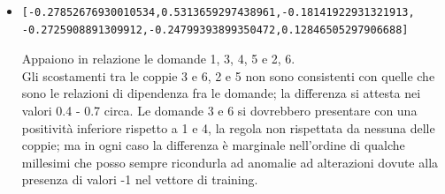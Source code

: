 \begin{itemize}
\item \begin{verbatim}[-0.27852676930010534,0.5313659297438961,-0.18141922931321913,
-0.2725908891309912,-0.24799393899350472,0.12846505297906688]
\end{verbatim}
Appaiono in relazione le domande 1, 3, 4, 5 e  2, 6.\\
Gli scostamenti tra le coppie 3 e 6, 2 e 5 non sono consistenti con quelle che sono le relazioni di dipendenza fra le domande; la differenza si attesta nei valori 0.4 - 0.7 circa. 
Le domande 3 e 6 si dovrebbero presentare con una positivit\`a inferiore rispetto a 1 e 4, la regola  non rispettata da nessuna delle coppie; ma in ogni caso la differenza \`e marginale  nell'ordine di qualche millesimi che posso sempre ricondurla ad anomalie ad alterazioni dovute alla presenza di valori -1 nel vettore di training.
\end{itemize}



